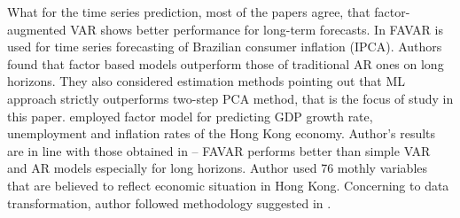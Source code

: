\documentclass[a4paper, 14pt]{article}
\begin{document}
What for the time series prediction, most of the papers agree, that factor-augmented VAR shows better performance for long-term forecasts. In \cite{figueiredo2013forecasting} FAVAR is used for time series forecasting of Brazilian consumer inflation (IPCA). Authors found that factor based models outperform those of traditional AR ones on long horizons. They also considered estimation methods pointing out that ML approach strictly outperforms two-step PCA method, that is the focus of study in this paper. \cite{pang2010forecasting} employed factor model for predicting GDP growth rate, unemployment and inflation rates of the Hong Kong economy. Author's results are in line with those obtained in \cite{figueiredo2013forecasting} -- FAVAR performs better than simple VAR and AR models especially for long horizons. Author used 76 mothly variables that are believed to reflect economic situation in Hong Kong. Concerning to data transformation, author followed methodology suggested in \cite{stock2005implications}.


\newpage


\end{document}
